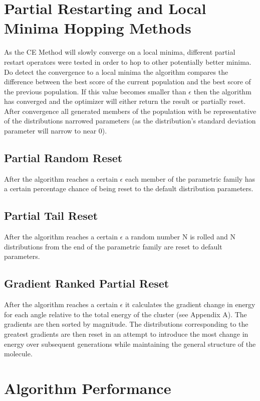 \documentclass[conference,letterpaper]{IEEEtran}
\begin{document}
\section{Partial Restarting and Local Minima Hopping Methods}
\par As the CE Method will slowly converge on a local minima, different partial restart operators were tested in order to hop to other potentially better minima. Do detect the convergence to a local minima the algorithm compares the difference between the best score of the current population and the best score of the previous population. If this value becomes smaller than $\epsilon$ then the algorithm has converged and the optimizer will either return the result or partially reset. After convergence all generated members of the population with be representative of the distributions narrowed parameters (as the distribution's standard deviation parameter will narrow to near 0).

\subsection{Partial Random Reset}
After the algorithm reaches a certain $\epsilon$ each member of the parametric family has a certain percentage chance of being reset to the default distribution parameters.

\subsection{Partial Tail Reset}
After the algorithm reaches a certain $\epsilon$ a random number N is rolled and N distributions from the end of the parametric family are reset to default parameters.

\subsection{Gradient Ranked Partial Reset}
After the algorithm reaches a certain $\epsilon$ it calculates the gradient change in energy for each angle relative to the total energy of the cluster (see Appendix A). The gradients are then sorted by magnitude. The distributions corresponding to the greatest gradients are then reset in an attempt to introduce the most change in energy over subsequent generations while maintaining the general structure of the molecule.

\newpage
\section{Algorithm Performance}
\end{document}
